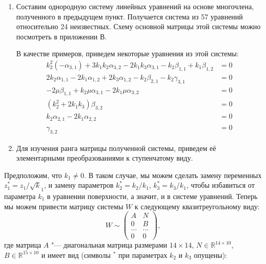 \documentclass[../main.tex]{subfiles}
\begin{document}
\begin{enumerate}
\item Составим однородную систему линейных уравнений на основе многочлена, полученного в предыдущем пункт. Получается система из 57 уравнений относительно 24 неизвестных. Схему основной матрицы этой системы можно посмотреть в приложении В. 

В качестве примеров, приведем некоторые уравнения из этой системы:
\begin{equation}
\begin{aligned}
k_2^2 \left(-\alpha _{3,1}\right)+3 k_1 k_2 \alpha _{3,2}-2 k_1 k_3 \alpha _{3,1}-k_2 \beta _{1,1}+k_1 \beta _{1,2} &= 0 \\
2 k_2 \alpha _{1,1}-2 k_1 \alpha _{1,2}+2 k_3 \alpha _{1,2}-k_2 \beta _{2,1}-k_2 \gamma _{3,1} &=0 \\
-2 \mu  \beta _{1,1}+k_2 \mu  \alpha _{3,1}-2 k_1 \mu  \alpha _{3,2} &= 0 \\
\left(k_2^2 + 2 k_1 k_3\right) \beta _{3,2} &=0 \\ 
k_2 \alpha _{2,1}-2 k_1 \alpha _{2,2} &= 0 \\
\gamma_{3,2} &= 0
\end{aligned}
\end{equation}
\item Для изучения ранга матрицы полученной системы, приведем её элементарными преобразованиями к ступенчатому виду.
\end{enumerate}

Предположим, что $k_1 \ne 0$. В таком случае, мы можем сделать замену переменных $z^*_1 = z_1
/ \sqrt k_1$, и замену параметров $k^*_2 = k_2 / k_1$, $k^*_3 = k_3 / k_1$, чтобы избавиться от параметра $k_1$ в уравнении поверхности, а значит, и в системе уравнений. Теперь мы можем привести матрицу системы $W$ к следующему квазитреугольному виду:
\begin{equation*}
W \sim
\begin{pmatrix}
A & N \\
0 & B \\
\hdots & \hdots  \\
0 & 0
\end{pmatrix},
\end{equation*}
где матрица $A$ "--- диагональная матрица размерами $14\times14$, $N\in \mathbb{R}^{14\times10}$, $B \in \mathbb{R}^{15\times10}$ и имеет вид (символы ${}^*$ при параметрах $k_2$ и $k_3$ опущены):
\end{document}
